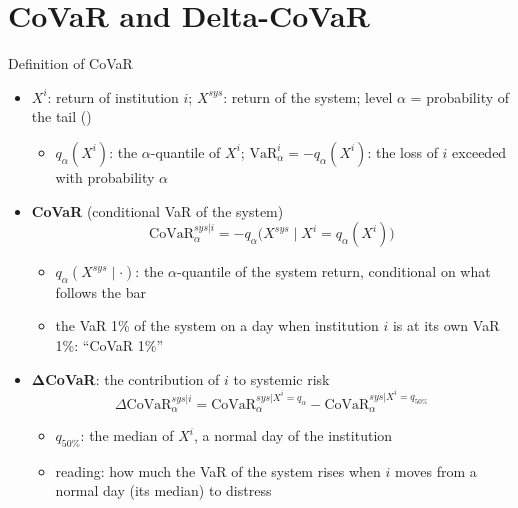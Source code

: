 \section{CoVaR and Delta-CoVaR}

\begin{frame}{Definition of CoVaR}
\itemsize{\small}
\begin{itemize}
    \item $X^i$: return of institution $i$; $X^{sys}$: return of the system; level $\alpha$ = probability of the tail ()
    \begin{itemize}
        \item $q_\alpha(X^i)$: the $\alpha$-quantile of $X^i$; $\mathrm{VaR}^i_\alpha = -q_\alpha(X^i)$: the loss of $i$ exceeded with probability $\alpha$
    \end{itemize}
    \item \textbf{CoVaR} (conditional VaR of the system)  \begin{equation*} \mathrm{CoVaR}^{sys|i}_\alpha = -q_\alpha\big(X^{sys} \mid X^i = q_\alpha(X^i)\big) \end{equation*}
    \begin{itemize}
        \item $q_\alpha(X^{sys} \mid \cdot)$: the $\alpha$-quantile of the system return, conditional on what follows the bar
        \item the VaR 1\% of the system on a day when institution $i$ is at its own VaR 1\%: ``CoVaR 1\%''
    \end{itemize}
    \item $\boldsymbol{\Delta}$\textbf{CoVaR}: the contribution of $i$ to systemic risk \begin{equation*} \Delta\mathrm{CoVaR}^{sys|i}_\alpha = \mathrm{CoVaR}^{sys|X^i = q_\alpha}_\alpha - \mathrm{CoVaR}^{sys|X^i = q_{50\%}}_\alpha \end{equation*}
    \begin{itemize}
        \item $q_{50\%}$: the median of $X^i$, a normal day of the institution
        \item reading: how much the VaR of the system rises when $i$ moves from a normal day (its median) to distress
    \end{itemize}
\end{itemize}
\end{frame}

